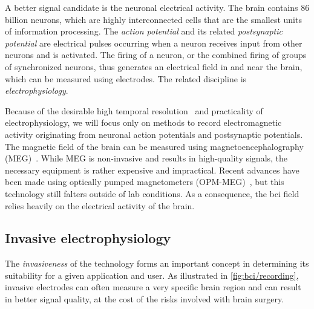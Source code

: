 A better signal candidate is the neuronal electrical activity.
The brain contains 86 billion neurons, which are highly interconnected cells that are
the smallest units of information processing.
The \emph{action potential} and its related \emph{postsynaptic potential} are electrical
pulses occurring when a neuron receives input from other neurons and is activated.
The firing of a neuron, or the combined firing of groups of synchronized neurons, thus
generates an electrical field in and near the brain, which can be measured using
electrodes.
The related discipline is \emph{electrophysiology}.

Because of the desirable high temporal resolution~\cite{Easttom2021} and practicality of
electrophysiology, we will focus only on methods to record electromagnetic activity
originating from neuronal action potentials and postsynaptic potentials.
The magnetic field of the brain can be measured using magnetoencephalography
(MEG)~\cite{Mellinger2007}.
While MEG is non-invasive and results in high-quality signals, the necessary equipment
is rather expensive and impractical.
Recent advances have been made using optically pumped magnetometers
(OPM-MEG)~\cite{Wittevrongel2021}, but this technology still falters outside of lab
conditions.
As a consequence, the \ac{bci} field relies heavily on the electrical activity of the
brain.

\subsection{Invasive electrophysiology}

The \emph{invasiveness} of the technology forms an important concept in determining its
suitability for a given application and user.
As illustrated in \cref{fig:bci/recording}, invasive electrodes can often measure a
very specific brain region and can result in better signal quality, at the cost of the
risks involved with brain surgery.

